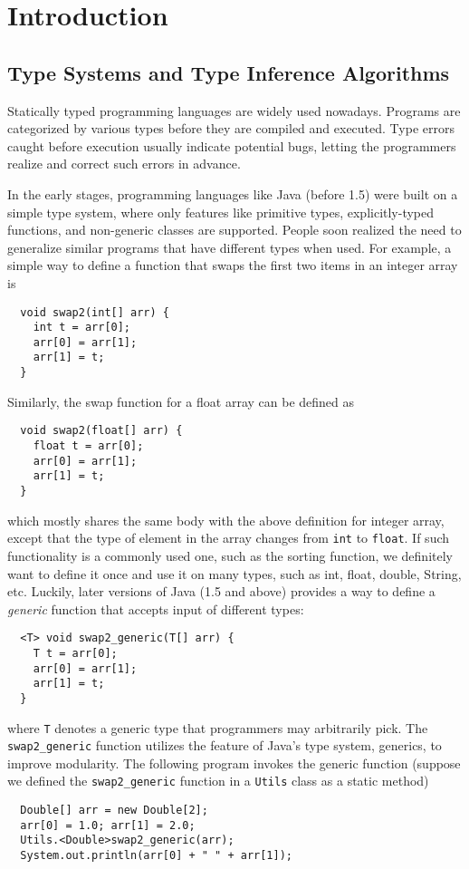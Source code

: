 \chapter{Introduction}


\section{Type Systems and Type Inference Algorithms}

Statically typed programming languages are widely used nowadays.
Programs are categorized by various types before they are compiled and executed.
Type errors caught before execution usually indicate potential bugs,
letting the programmers realize and correct such errors in advance.

In the early stages, programming languages like Java (before 1.5)
were built on a simple type system,
where only features like
primitive types, explicitly-typed functions,
and non-generic classes are supported.
People soon realized the need to generalize similar programs
that have different types when used.
For example, a simple way to define a function that swaps
the first two items in an integer array is
\begin{verbatim}
  void swap2(int[] arr) {
    int t = arr[0];
    arr[0] = arr[1];
    arr[1] = t;
  }
\end{verbatim}
Similarly, the swap function for a float array can be defined as
\begin{verbatim}
  void swap2(float[] arr) {
    float t = arr[0];
    arr[0] = arr[1];
    arr[1] = t;
  }
\end{verbatim}
which mostly shares the same body with the above definition for integer array,
except that the type of element in the array changes from \verb|int| to \verb|float|.
If such functionality is a commonly used one,
such as the sorting function,
we definitely want to define it once and use it on many types,
such as int, float, double, String, etc.
Luckily, later versions of Java (1.5 and above)
provides a way to define a \emph{generic} function that accepts input of different types:
\begin{verbatim}
  <T> void swap2_generic(T[] arr) {
    T t = arr[0];
    arr[0] = arr[1];
    arr[1] = t;
  }
\end{verbatim}
where \verb|T| denotes a generic type that programmers may arbitrarily pick.
The \verb|swap2_generic| function utilizes the feature of Java's type system, generics,
to improve modularity.
The following program invokes the generic function (suppose we defined
the \verb|swap2_generic| function in a \verb|Utils| class as a static method)
\begin{verbatim}
  Double[] arr = new Double[2];
  arr[0] = 1.0; arr[1] = 2.0;
  Utils.<Double>swap2_generic(arr);
  System.out.println(arr[0] + " " + arr[1]);
\end{verbatim}

